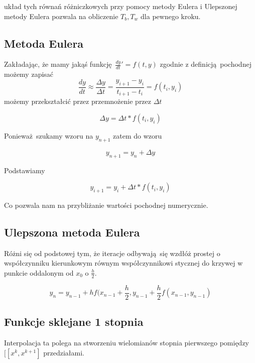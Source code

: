 \documentclass[varwidth,12pt,a4paper]{article}
\begin{document}
układ tych równań różniczkowych przy pomocy metody Eulera i Ulepszonej metody Eulera pozwala na obliczenie $T_b, T_w$ dla pewnego kroku.

\subsection{Metoda Eulera}

Zakładając, że mamy jakąś funkcję $\frac{dy}{dt}' = f(t,y)$
zgodnie z definicją pochodnej możemy zapisać
\begin{equation}
   \frac{dy}{dt} \approx \frac{\Delta y}{\Delta t} = \frac{y_{i+1} - y_i}{t_{i+1} - t_i} = f(t_i, y_i)
\end{equation}
możemy przekształcić przez przemnożenie przez $\Delta t$

\begin{equation}
    \Delta y = \Delta t * f(t_i, y_i)
\end{equation}

Ponieważ szukamy wzoru na $y_{n+1}$ zatem do wzoru

\begin{equation}
    y_{n+1} = y_n + \Delta y
\end{equation}

Podstawiamy

\begin{equation}
    y_{i+1} = y_i + \Delta t * f(t_i, y_i)
\end{equation}

Co pozwala nam na przybliżanie wartości pochodnej numerycznie.

\subsection{Ulepszona metoda Eulera}

Różni się od podstowej tym, że iteracje odbywają się wzdłóż prostej o współczynniku
kierunkowym równym współczynnikowi stycznej do krzywej w punkcie oddalonym od 
$x_0$ o $\frac{h}{2}$.

\begin{equation}
    y_n = y_{n-1} + hf(x_{n-1} + \frac{h}{2}, y_{n-1} + \frac{h}{2} f(x_{n-1}, y_{n-1})
\end{equation}

\subsection{Funkcje sklejane 1 stopnia}

Interpolacja ta polega na stworzeniu wielomianów stopnia pierwszego pomiędzy $ [[x^k, x^{k+1}] $ przedziałami.
\end{document}
